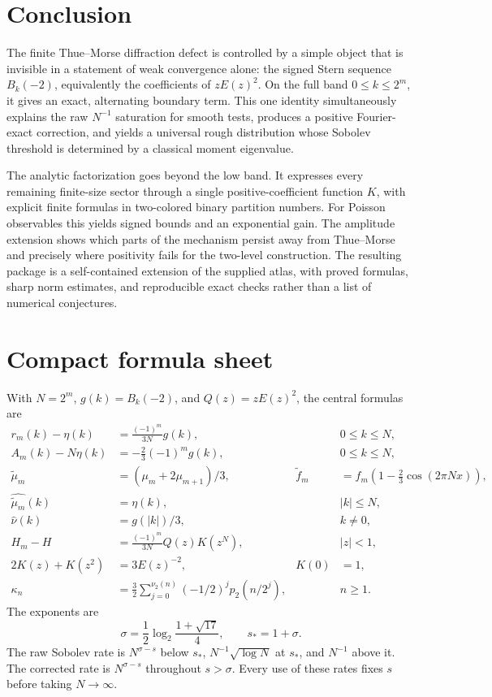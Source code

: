 \documentclass[11pt,a4paper]{article}
\numberwithin{equation}{section}
\theoremstyle{definition}
\theoremstyle{remark}
\newcommand{\mt}{\widetilde\mu}
\newcommand{\ft}{\widetilde f}
\newcommand{\vnu}{\nu_2}
\begin{document}
\section{Conclusion}
The finite Thue--Morse diffraction defect is controlled by a simple object that
is invisible in a statement of weak convergence alone: the signed Stern sequence
$B_k(-2)$, equivalently the coefficients of $zE(z)^2$. On the full band
$0\le k\le2^m$, it gives an exact, alternating boundary term. This one identity
simultaneously explains the raw $N^{-1}$ saturation for smooth tests, produces a
positive Fourier-exact correction, and yields a universal rough distribution
whose Sobolev threshold is determined by a classical moment eigenvalue.

The analytic factorization goes beyond the low band. It expresses every remaining
finite-size sector through a single positive-coefficient function $K$, with explicit
finite formulas in two-colored binary partition numbers. For Poisson observables
this yields signed bounds and an exponential gain. The amplitude extension shows
which parts of the mechanism persist away from Thue--Morse and precisely where
positivity fails for the two-level construction. The resulting package is a
self-contained extension of the supplied atlas, with proved formulas, sharp
norm estimates, and reproducible exact checks rather than a list of numerical
conjectures.

\appendix
\section{Compact formula sheet}
\label{app:formula}
With $N=2^m$, $g(k)=B_k(-2)$, and $Q(z)=zE(z)^2$, the central formulas are
\begin{align*}
 r_m(k)-\eta(k)&=\frac{(-1)^m}{3N}g(k),&&0\le k\le N,\\
 A_m(k)-N\eta(k)&=-\frac23(-1)^mg(k),&&0\le k\le N,\\
 \mt_m&=(\mu_m+2\mu_{m+1})/3,&
 \ft_m&=f_m(1-\tfrac23\cos(2\pi Nx)),\\
 \widehat{\mt_m}(k)&=\eta(k),&&|k|\le N,\\
 \widehat\nu(k)&=g(|k|)/3,&&k\ne0,\\
 H_m-H&=\frac{(-1)^m}{3N}Q(z)K(z^N),&&|z|<1,\\
 2K(z)+K(z^2)&=3E(z)^{-2},&K(0)&=1,\\
 \kappa_n&=\frac32\sum_{j=0}^{\vnu(n)}(-1/2)^jp_2(n/2^j),&&n\ge1.
\end{align*}
The exponents are
\[
 \sigma=\frac12\log_2\frac{1+\sqrt{17}}4,\qquad s_*=1+\sigma.
\]
The raw Sobolev rate is $N^{\sigma-s}$ below $s_*$, $N^{-1}\sqrt{\log N}$ at
$s_*$, and $N^{-1}$ above it. The corrected rate is $N^{\sigma-s}$ throughout
$s>\sigma$. Every use of these rates fixes $s$ before taking $N\to\infty$.
\end{document}
